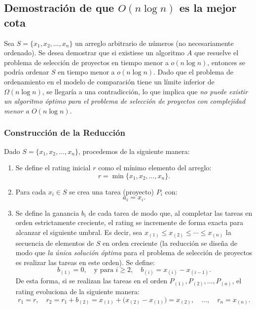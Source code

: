 ﻿\documentclass{article}
\theoremstyle{plain}
\theoremstyle{definition}
\begin{document}
\subsection{Demostración de que \(O(n\log n)\) es la mejor cota}

Sea \(S=\{x_1,x_2,\dots,x_n\}\) un arreglo arbitrario de números (no necesariamente ordenado). Se desea demostrar que si existiese un algoritmo \(A\) que resuelve el problema de selección de proyectos en tiempo menor a \(o(n\log n)\), entonces se podría ordenar \(S\) en tiempo menor a \(o(n\log n)\). Dado que el problema de ordenamiento en el modelo de comparación tiene un límite inferior de \(\Omega(n\log n)\), se llegaría a una contradicción, lo que implica que \emph{no puede existir un algoritmo óptimo para el problema de selección de proyectos con complejidad menor a \(O(n\log n)\)}.
\\

\subsubsection{Construcción de la Reducción}
Dado \(S=\{x_1,x_2,\dots,x_n\}\), procedemos de la siguiente manera:

\begin{enumerate}
    \item Se define el rating inicial \(r\) como el mínimo elemento del arreglo:
    \[
    r = \min\{x_1,x_2,\dots,x_n\}.
    \]
    \item Para cada \(x_i \in S\) se crea una tarea (proyecto) \(P_i\) con:
    \[
    a_i = x_i.
    \]
    \item Se define la ganancia \(b_i\) de cada tarea de modo que, al completar las tareas en orden estrictamente creciente, el rating se incremente de forma exacta para alcanzar el siguiente umbral. Es decir, sea \(x_{(1)} \le x_{(2)} \le \cdots \le x_{(n)}\) la secuencia de elementos de \(S\) en orden creciente (la reducción se diseña de modo que \emph{la única solución óptima} para el problema de selección de proyectos es realizar las tareas en este orden). Se define:
    \[
    b_{(1)} = 0,\quad\text{y para } i\ge2,\quad b_{(i)} = x_{(i)} - x_{(i-1)}.
    \]
    De esta forma, si se realizan las tareas en el orden \(P_{(1)}, P_{(2)}, \dots, P_{(n)}\), el rating evoluciona de la siguiente manera:
    \[
    r_1 = r,\quad r_2 = r_1 + b_{(2)} = x_{(1)} + \bigl(x_{(2)}-x_{(1)}\bigr)=x_{(2)},\quad \dots,\quad r_n = x_{(n)}.
    \]
\end{enumerate}
\end{document}
